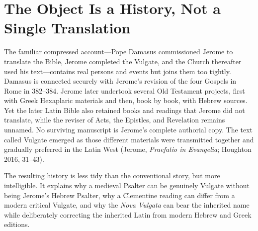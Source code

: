 \section{The Object Is a History, Not a Single Translation}


The familiar compressed account---Pope Damasus commissioned Jerome to translate the Bible, Jerome completed the Vulgate, and the Church thereafter used his text---contains real persons and events but joins them too tightly. Damasus is connected securely with Jerome's revision of the four Gospels in Rome in 382--384. Jerome later undertook several Old Testament projects, first with Greek Hexaplaric materials and then, book by book, with Hebrew sources. Yet the later Latin Bible also retained books and readings that Jerome did not translate, while the reviser of Acts, the Epistles, and Revelation remains unnamed. No surviving manuscript is Jerome's complete authorial copy. The text called Vulgate emerged as those different materials were transmitted together and gradually preferred in the Latin West (Jerome, \emph{Praefatio in Evangelia}; Houghton 2016, 31--43).

The resulting history is less tidy than the conventional story, but more intelligible. It explains why a medieval Psalter can be genuinely Vulgate without being Jerome's Hebrew Psalter, why a Clementine reading can differ from a modern critical Vulgate, and why the \emph{Nova Vulgata} can bear the inherited name while deliberately correcting the inherited Latin from modern Hebrew and Greek editions.
